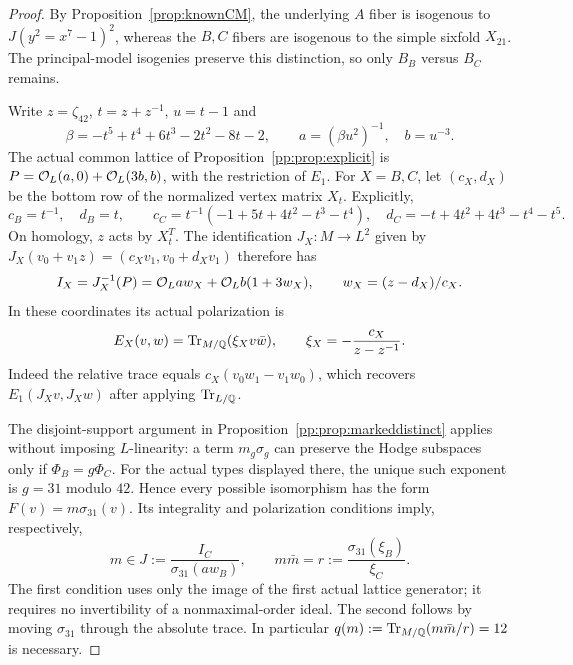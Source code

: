 \begin{proof}
By Proposition~\ref{prop:knownCM}, the underlying $A$ fiber is isogenous
to $J(y^2=x^7-1)^2$, whereas the $B,C$ fibers are isogenous to the simple
sixfold $X_{21}$. The principal-model isogenies preserve this distinction,
so only $B_B$ versus $B_C$ remains.

Write $z=\zeta_{42}$, $t=z+z^{-1}$, $u=t-1$ and
\[
 \beta=-t^5+t^4+6t^3-2t^2-8t-2,\qquad
 a=(\beta u^2)^{-1},\quad b=u^{-3}.
\]
The actual common lattice of Proposition~\ref{pp:prop:explicit} is
$P=\mathcal O_L(a,0)+\mathcal O_L(3b,b)$, with the restriction of $E_1$.
For $X=B,C$, let $(c_X,d_X)$ be the bottom row of the normalized
vertex matrix $X_t$. Explicitly,
\[
 c_B=t^{-1},\quad d_B=t,\qquad
 c_C=t^{-1}(-1+5t+4t^2-t^3-t^4),\quad
 d_C=-t+4t^2+4t^3-t^4-t^5.
\]
On homology, $z$ acts by $X_t^T$. The identification
$J_X:M\longrightarrow L^2$ given by
$J_X(v_0+v_1z)=(c_Xv_1,v_0+d_Xv_1)$ therefore has
\[
 I_X=J_X^{-1}(P)=\mathcal O_L a w_X+\mathcal O_L b(1+3w_X),\qquad
 w_X=(z-d_X)/c_X.
\]
In these coordinates its actual polarization is
\[
 E_X(v,w)=\operatorname{Tr}_{M/\mathbb Q}(\xi_Xv\bar w),\qquad
 \xi_X=-\frac{c_X}{z-z^{-1}}.
\]
Indeed the relative trace equals $c_X(v_0w_1-v_1w_0)$, which
recovers $E_1(J_Xv,J_Xw)$ after applying $\operatorname{Tr}_{L/\mathbb Q}$.

The disjoint-support argument in
Proposition~\ref{pp:prop:markeddistinct} applies without imposing
$L$-linearity: a term $m_g\sigma_g$ can preserve the Hodge subspaces
only if $\Phi_B=g\Phi_C$. For the actual types displayed there, the
unique such exponent is $g=31$ modulo $42$. Hence every possible
isomorphism has the form $F(v)=m\sigma_{31}(v)$. Its integrality and
polarization conditions imply, respectively,
\[
 m\in J:=\frac{I_C}{\sigma_{31}(aw_B)},\qquad
 m\bar m=r:=\frac{\sigma_{31}(\xi_B)}{\xi_C}.
\]
The first condition uses only the image of the first actual lattice
generator; it requires no invertibility of a nonmaximal-order ideal.
The second follows by moving $\sigma_{31}$ through the absolute trace.
In particular $q(m):=\operatorname{Tr}_{M/\mathbb Q}(m\bar m/r)=12$ is necessary.


\end{proof}
